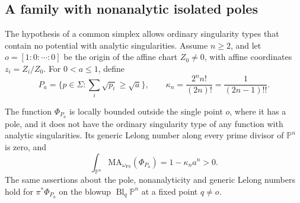 \subsection{A family with nonanalytic isolated poles}
\label{sec:curved-nonanalytic-references}

The hypothesis of a common simplex allows ordinary singularity types that contain no potential with analytic singularities. Assume $n\geq2$, and let $o=[1:0:\cdots:0]$ be the origin of the affine chart $Z_0\ne0$, with affine coordinates $z_i=Z_i/Z_0$. For $0<a\leq1$, define
\[
 P_a=\{p\in\Sigma:\textstyle\sum_i\sqrt{p_i}\geq\sqrt a\},
 \qquad
 \kappa_n=\frac{2^n n!}{(2n)!}=\frac1{(2n-1)!!}.
\]

\begin{proposition}\label{prop:curved-nonanalytic-reference}
The function $\Phi_{P_a}$ is locally bounded outside the single point $o$, where it has a pole, and it does not have the ordinary singularity type of any function with analytic singularities. Its generic Lelong number along every prime divisor of $\mathbb P^n$ is zero, and
\begin{equation}\label{eq:curved-nonanalytic-mass}
 \int_{\mathbb P^n}\mathrm{MA}_{\omega_{\mathrm{FS}}}(\Phi_{P_a})
 =1-\kappa_n a^n>0.
\end{equation}
The same assertions about the pole, nonanalyticity and generic Lelong numbers hold for $\pi^*\Phi_{P_a}$ on the blowup $\operatorname{Bl}_q\mathbb P^n$ at a fixed point $q\ne o$.
\end{proposition}
